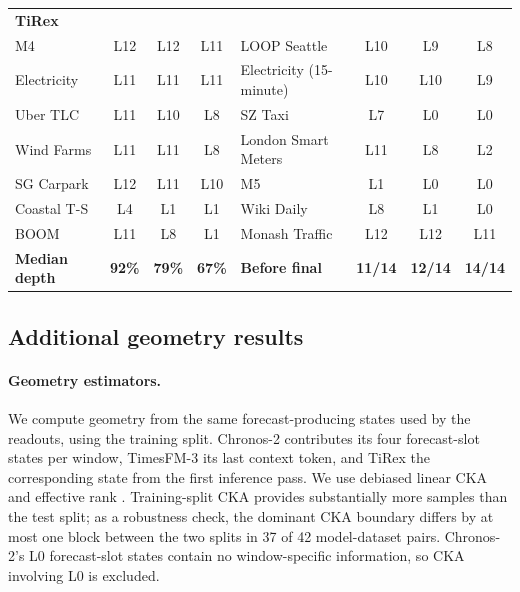 \documentclass{article} %
\begin{document}
\begin{table}[p]
\begin{tabular}{@{}lccc@{\qquad}lccc@{}}
  \midrule
  \multicolumn{8}{l}{\textbf{TiRex}} \\
  M4 & L12 & L12 & L11 & LOOP Seattle & L10 & L9 & L8 \\
  Electricity & L11 & L11 & L11 & Electricity (15-minute) & L10 & L10 & L9 \\
  Uber TLC & L11 & L10 & L8 & SZ Taxi & L7 & L0 & L0 \\
  Wind Farms & L11 & L11 & L8 & London Smart Meters & L11 & L8 & L2 \\
  SG Carpark & L12 & L11 & L10 & M5 & L1 & L0 & L0 \\
  Coastal T-S & L4 & L1 & L1 & Wiki Daily & L8 & L1 & L0 \\
  BOOM & L11 & L8 & L1 & Monash Traffic & L12 & L12 & L11 \\
  \textbf{Median depth} & \textbf{92\%} & \textbf{79\%} & \textbf{67\%} &
  \textbf{Before final} & \textbf{11/14} & \textbf{12/14} & \textbf{14/14} \\
  \bottomrule
  \end{tabular}
\end{table}




\clearpage



\subsection{Additional geometry results}
\label{app:geometry}

\paragraph{Geometry estimators.}
We compute geometry from the same forecast-producing states used by the readouts, using the
training split. Chronos-2 contributes its four forecast-slot states per window, TimesFM-3 its last
context token, and TiRex the corresponding state from the first inference pass. We use debiased
linear CKA \citep{kornblith2019similarityneuralnetworkrepresentations,
cortes2024algorithmslearningkernelsbased,murphy2024correctingbiasedcenteredkernel} and effective
rank \citep{7098875}.
Training-split CKA provides substantially more samples than the test split; as a robustness check,
the dominant CKA boundary differs by at most one block between the two splits in 37 of 42
model-dataset pairs. Chronos-2's L0 forecast-slot states contain no window-specific information,
so CKA involving L0 is excluded.
\end{document}
